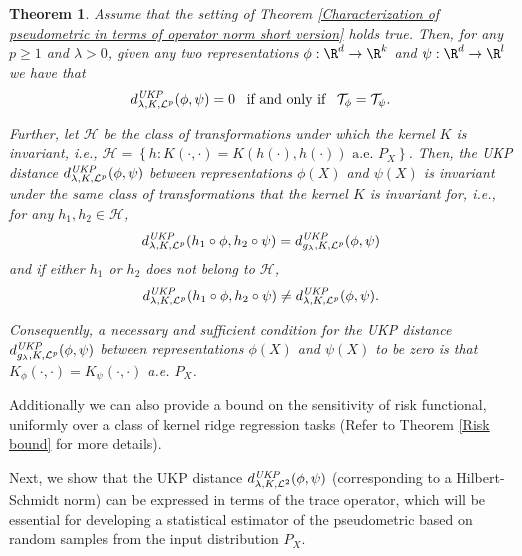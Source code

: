 \documentclass{article} %
\newcommand{\repone}{\phi}
\newcommand{\reptwo}{\psi}
\newcommand{\Hone}{\mathcal{H}_{\phi}}
\newcommand{\Tone}{\mathcal{T}_{\repone}}
\newcommand{\Ttwo}{\mathcal{T}_{\reptwo}}
\newcommand{\gl}{g_{\lambda}}
\newcommand{\inprod}[1]{\left \langle #1 \right\rangle}
\newcommand{\metricstname}{UKP }
\newcommand{\dtwo}{d_{\lambda,K,\mathcal{L}^{2}}^{\emph{\metricstname}}}
\newcommand{\dLp}{d_{\lambda,K,\mathcal{L}^{p}}^{\emph{\metricstname}}}
\newcommand{\dLpgl}{d_{\gl,K,\mathcal{L}^{p}}^{\emph{\metricstname}}}
\theoremstyle{plain}
\newcounter{theoremno}
\newtheorem{theorem}[theoremno]{Theorem}
\begin{document}
\begin{theorem}\label{Invariance of UKP distance}
     Assume that the setting of Theorem \ref{Characterization of pseudometric in terms of operator norm short version} holds true. Then, for any $p \geq 1$ and $\lambda>0$, given any two representations $\repone: \R^d \to \R^k$ and $\reptwo: \R^d \to \R^l$ we have that 
     \begin{equation}\label{Necessity and sufficiency of UKP distance being zero if and only if the integral operators coincide short version}
         \dLp(\repone,\reptwo) = 0 \,\ \textrm{ if and only if }\,\ \Tone = \Ttwo .
     \end{equation}

     Further, let $\mathcal{H}$ be the class of transformations under which the kernel $K$ is invariant, i.e., $\mathcal{H} = \left\{h : K(\cdot,\cdot) = K(h(\cdot),h(\cdot))\textrm{ a.e. } P_{X}\right\}$. Then, the \emph{\metricstname} distance $\dLp(\repone,\reptwo)$ between representations $\repone(X)$ and $\reptwo(X)$ is invariant under the same class of transformations that the kernel $K$ is invariant for, i.e., for any $h_{1},h_{2} \in \mathcal{H}$, 
\[
\dLp(h_{1} \circ \repone,h_{2} \circ \reptwo) = \dLpgl(\repone,\reptwo)
\]
and if either $h_{1}$ or $h_{2}$ does not belong to $\mathcal{H}$, \[
\dLp(h_{1} \circ \repone,h_{2} \circ \reptwo) \neq \dLp(\repone,\reptwo).
\]

Consequently, a necessary and sufficient condition for the \emph{\metricstname} distance $\dLpgl(\repone,\reptwo)$ between representations $\repone(X)$ and $\reptwo(X)$ to be zero is that $K_{\repone}(\cdot,\cdot) = K_{\reptwo}(\cdot,\cdot)$ a.e. $P_{X}$.
\end{theorem}

Additionally we can also provide a bound on the sensitivity of risk functional, uniformly over a class of kernel ridge regression tasks (Refer to Theorem \ref{Risk bound} for more details). 


Next, we show that the \metricstname distance $\dtwo(\repone,\reptwo)$ (corresponding to a Hilbert-Schmidt norm) can be expressed in terms of the trace operator, which will be essential for developing a statistical estimator of the pseudometric based on random samples from the input distribution $P_{X}$. 
\end{document}
